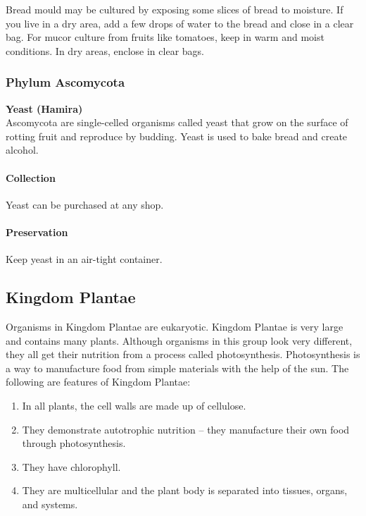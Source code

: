 \begin{multicols}{2}
Bread mould may be cultured by exposing some slices of bread to moisture. If you live in a dry area, add a few drops of water to the bread and close in a clear bag.
For mucor culture from fruits like tomatoes, keep in warm and moist conditions. In dry areas, enclose in clear bags. 

\subsubsection{Phylum Ascomycota}

\textbf{Yeast (Hamira)}\\
Ascomycota are single-celled organisms called yeast that grow on the surface of rotting fruit and reproduce by budding. Yeast is used to bake bread and create alcohol.

\paragraph{Collection}
Yeast can be purchased at any shop.

\paragraph{Preservation} 
Keep yeast in an air-tight container.

\end{multicols}

\pagebreak

\subsection{Kingdom Plantae}
Organisms in Kingdom Plantae are eukaryotic. Kingdom Plantae is very large and contains many plants.
Although organisms in this group look very different, they all get their nutrition from a process called photosynthesis. Photosynthesis is a way to manufacture food from simple materials with the help of the sun.
 The following are features of Kingdom Plantae:
\begin{enumerate}
\item{In all plants, the cell walls are made up of cellulose.}
\item{They demonstrate autotrophic nutrition -- they manufacture their own food through photosynthesis.}
\item{They have chlorophyll.}
\item{They are multicellular and the plant body is separated into tissues, organs, and systems.}
\end{enumerate}

